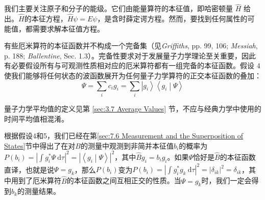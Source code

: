     \begin{center}
    \end{center}

    我们主要关注原子和分子的能级。它们由能量算符的本征值，即哈密顿量 $\hat{H}$ 给出。$\hat{H}$的本征方程，$\hat{H}\psi = E\psi$，是含时薛定谔方程。然而，要找到任何属性的可能值，都需要求解本征值方程。

    \begin{center}
    \end{center}

    有些厄米算符的本征函数并不构成一个完备集（见\textit{Griffiths}, pp. 99, 106; \textit{Messiah}, p. 188; \textit{Ballentine}, Sec. 1.3）。完备性要求对于发展量子力学理论至关重要，因此有必要假设所有与可观测性质相对应的厄米算符都有一组完备的本征函数。假设 4 使我们能够将任何状态的波函数展开为任何量子力学算符的正交本征函数的叠加：
    \begin{equation}
        \Psi = \sum_{i}c_ig_i = \sum_{i}\left| g_i \right\rangle \left\langle g_i \middle| \Psi \right\rangle
        \label{eq:7.95}
    \end{equation}

    \begin{center}
    \end{center}

    量子力学平均值的定义见第 \ref{sec:3.7 Average Values} 节，不应与经典力学中使用的时间平均值相混淆。

    根据假设4和5，我们已经在第\ref{sec:7.6 Measurement and the Superposition of States}节中得出了在对$B$的测量中观测到非简并本征值$b_i$的概率为$P\left(b_i\right) = \left|\int g_i^{\ast}\Psi \: \mathrm{d}\tau\right|^2 = \left|\left\langle g_i \middle| \Psi \right\rangle\right|^2$，其中$\hat{B}g_i = b_ig_i$。如果$\Psi$恰好是$\hat{B}$的本征函数直译，也就是说$\Psi = g_k$，那么$P\left(b_i\right)$变为$P\left(b_i\right) = \left|\int g_i^{\ast}g_k\:\mathrm{d}\tau\right|^2 = \left|\delta_{ik}\right|^2 = \delta_{ik}$，其中用到了厄米算符$\hat{B}$的本征函数之间互相正交的性质。当$\Psi = g_k$时，我们一定会得到$b_k$的测量结果。

